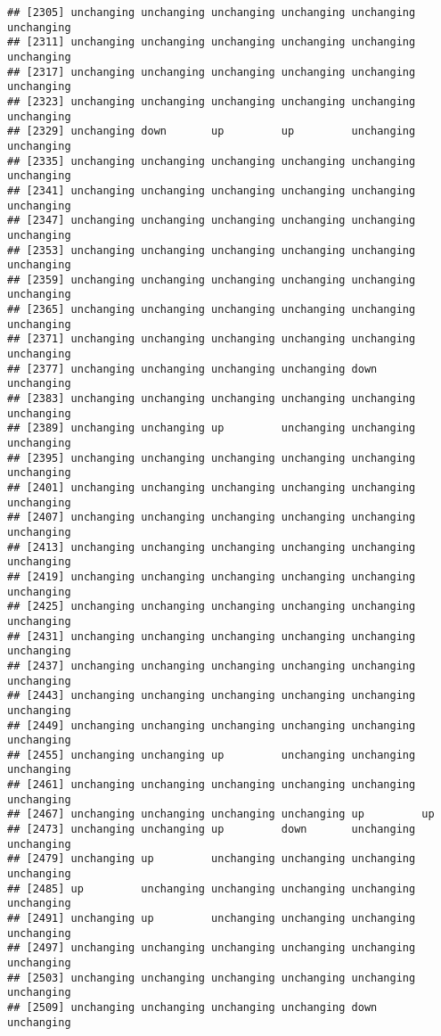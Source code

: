 \documentclass[]{article}
\begin{document}
\begin{verbatim}
## [2305] unchanging unchanging unchanging unchanging unchanging unchanging
## [2311] unchanging unchanging unchanging unchanging unchanging unchanging
## [2317] unchanging unchanging unchanging unchanging unchanging unchanging
## [2323] unchanging unchanging unchanging unchanging unchanging unchanging
## [2329] unchanging down       up         up         unchanging unchanging
## [2335] unchanging unchanging unchanging unchanging unchanging unchanging
## [2341] unchanging unchanging unchanging unchanging unchanging unchanging
## [2347] unchanging unchanging unchanging unchanging unchanging unchanging
## [2353] unchanging unchanging unchanging unchanging unchanging unchanging
## [2359] unchanging unchanging unchanging unchanging unchanging unchanging
## [2365] unchanging unchanging unchanging unchanging unchanging unchanging
## [2371] unchanging unchanging unchanging unchanging unchanging unchanging
## [2377] unchanging unchanging unchanging unchanging down       unchanging
## [2383] unchanging unchanging unchanging unchanging unchanging unchanging
## [2389] unchanging unchanging up         unchanging unchanging unchanging
## [2395] unchanging unchanging unchanging unchanging unchanging unchanging
## [2401] unchanging unchanging unchanging unchanging unchanging unchanging
## [2407] unchanging unchanging unchanging unchanging unchanging unchanging
## [2413] unchanging unchanging unchanging unchanging unchanging unchanging
## [2419] unchanging unchanging unchanging unchanging unchanging unchanging
## [2425] unchanging unchanging unchanging unchanging unchanging unchanging
## [2431] unchanging unchanging unchanging unchanging unchanging unchanging
## [2437] unchanging unchanging unchanging unchanging unchanging unchanging
## [2443] unchanging unchanging unchanging unchanging unchanging unchanging
## [2449] unchanging unchanging unchanging unchanging unchanging unchanging
## [2455] unchanging unchanging up         unchanging unchanging unchanging
## [2461] unchanging unchanging unchanging unchanging unchanging unchanging
## [2467] unchanging unchanging unchanging unchanging up         up        
## [2473] unchanging unchanging up         down       unchanging unchanging
## [2479] unchanging up         unchanging unchanging unchanging unchanging
## [2485] up         unchanging unchanging unchanging unchanging unchanging
## [2491] unchanging up         unchanging unchanging unchanging unchanging
## [2497] unchanging unchanging unchanging unchanging unchanging unchanging
## [2503] unchanging unchanging unchanging unchanging unchanging unchanging
## [2509] unchanging unchanging unchanging unchanging down       unchanging

\end{verbatim}
\end{document}
